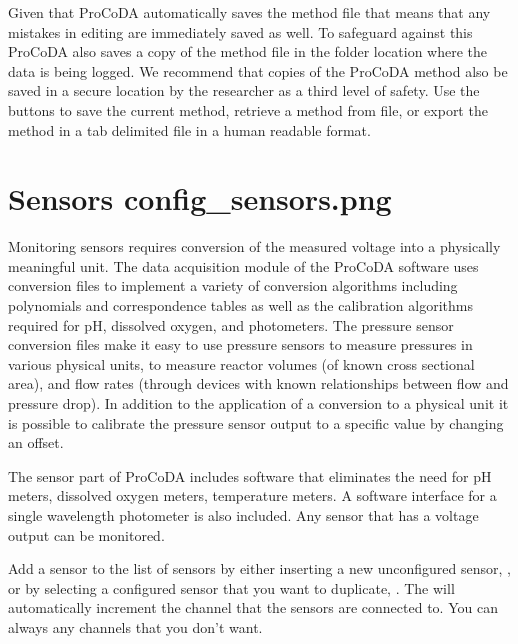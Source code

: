 \documentclass[letterpaper,10pt,english]{sphinxmanual}
\begin{document}
Given that ProCoDA automatically saves the method file that means that any mistakes in editing are immediately saved as well. To safeguard against this ProCoDA also saves a copy of the method file in the folder location where the data is being logged. We recommend that copies of the ProCoDA method also be saved in a secure location by the researcher as a third level of safety. Use the  buttons to save the current method, retrieve a method from file, or export the method in a tab delimited file in a human readable format.


\section[Sensors]{Sensors \lowercase{\sphinxincludegraphics}{{config_sensors}.png}}
\label{\detokenize{ProCoDA/ProCoDA:sensors-config-sensors}}\label{\detokenize{ProCoDA/ProCoDA:heading-procoda-sensors}}
Monitoring sensors requires conversion of the measured voltage into a physically meaningful unit. The data acquisition module of the ProCoDA software uses conversion files to implement a variety of conversion algorithms including polynomials and correspondence tables as well as the calibration algorithms required for pH, dissolved oxygen, and photometers. The pressure sensor conversion files make it easy to use pressure sensors to measure pressures in various physical units, to measure reactor volumes (of known cross sectional area), and flow rates (through devices with known relationships between flow and pressure drop). In addition to the application of a conversion to a physical unit it is possible to calibrate the pressure sensor output to a specific value by changing an offset.

The sensor part of ProCoDA includes software that eliminates the need for pH meters, dissolved oxygen meters, temperature meters. A software interface for a single wavelength photometer is also included. Any sensor that has a voltage output can be monitored.

Add a sensor to the list of sensors by either inserting a new unconfigured sensor, , or by selecting a configured sensor that you want to duplicate, . The  will automatically increment the channel that the sensors are connected to. You can always  any channels that you don’t want.
\end{document}
